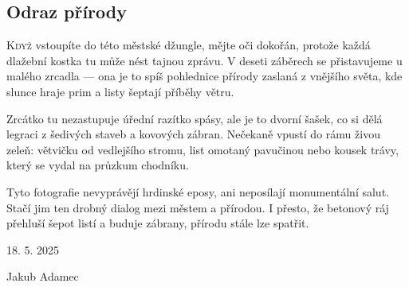 \documentclass[14pt]{extreport}
\begin{document}
\begin{center}
    
\end{center}

\vspace*{-16em}

\subsection*{Odraz přírody}
\lettrine[lines=3, findent=5pt, nindent=0pt]{K}{dyž} vstoupíte do této městské džungle, mějte oči dokořán, protože 
každá dlažební kostka tu může nést tajnou zprávu. V deseti záběrech se přistavujeme u malého zrcadla — ona je to spíš 
pohlednice přírody zaslaná z vnějšího světa, kde slunce hraje prim a listy šeptají příběhy větru.

Zrcátko tu nezastupuje úřední razítko spásy, ale je to dvorní šašek, co si dělá legraci z šedivých staveb a kovových 
zábran. Nečekaně vpustí do rámu živou zeleň: větvičku od vedlejšího stromu, list omotaný pavučinou nebo kousek 
trávy, který se vydal na průzkum chodníku.

\vspace{2em}

Tyto fotografie nevyprávějí hrdinské eposy, ani neposílají monumentální salut. Stačí jim ten drobný dialog mezi městem 
a přírodou.  I přesto, že 
betonový ráj přehluší šepot listí a buduje zábrany, přírodu stále lze spatřit.

\vspace{3em}

\mbox{}\hfill{18. 5. 2025}

\mbox{}\hfill{Jakub Adamec}
\end{document}
